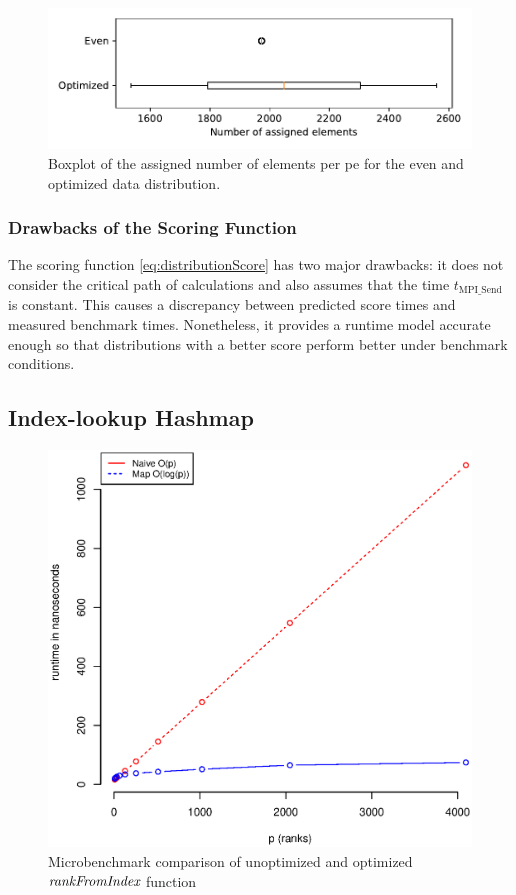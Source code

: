 \begin{figure}
\centering
\includegraphics[scale=0.75]{figures/optimizedDistributionBoxplot.pdf}
\caption{Boxplot of the assigned number of elements per \gls{pe} for the even and optimized data distribution.}
\label{fig:distributionBoxplot}
\end{figure}


\subsubsection{Drawbacks of the Scoring Function}
\label{sec:ScoringFunctionDrawbacks}
The scoring function \eqref{eq:distributionScore} has two major drawbacks:
it does not consider the critical path of calculations and also assumes that the time $t_\textrm{MPI\_Send}$ is constant.
This causes a discrepancy between predicted score times and measured benchmark times.
Nonetheless, it provides a runtime model accurate enough so that distributions with a better score perform better under benchmark conditions.


\subsection{Index-lookup Hashmap}
\label{sec:IndexLookupHashmap}

\begin{figure}
\centering
\includegraphics[scale=0.55]{figures/microbenchmark_rank_from_index.eps}
\caption{Microbenchmark comparison of unoptimized and optimized $\textit{rankFromIndex}$ function}
\label{fig:microbenchmarkRankFromIndex}

\end{figure}

